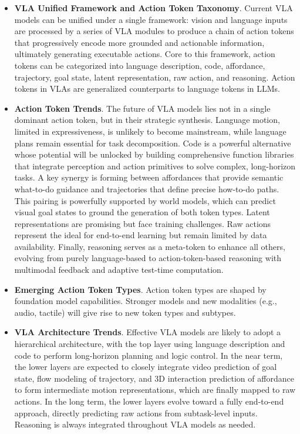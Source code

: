 \documentclass[10pt, a4paper, logo, copyright]{googledeepmind} %
\begin{document}
\begin{itemize}
    \item \textbf{VLA Unified Framework and Action Token Taxonomy}. Current VLA models can be unified under a single framework: vision and language inputs are processed by a series of VLA modules to produce a chain of action tokens that progressively encode more grounded and actionable information, ultimately generating executable actions. Core to this framework, action tokens can be categorized into language description, code, affordance, trajectory, goal state, latent representation, raw action, and reasoning. Action tokens in VLAs are generalized counterparts to language tokens in LLMs.
    \vspace{5pt}
    \item \textbf{Action Token Trends}. The future of VLA models lies not in a single dominant action token, but in their strategic synthesis. Language motion, limited in expressiveness, is unlikely to become mainstream, while language plans remain essential for task decomposition. Code is a powerful alternative whose potential will be unlocked by building comprehensive function libraries that integrate perception and action primitives to solve complex, long-horizon tasks. A key synergy is forming between affordances that provide semantic what-to-do guidance and trajectories that define precise how-to-do paths. This pairing is powerfully supported by world models, which can predict visual goal states to ground the generation of both token types. Latent representations are promising but face training challenges. Raw actions represent the ideal for end-to-end learning but remain limited by data availability. Finally, reasoning serves as a meta-token to enhance all others, evolving from purely language-based to action-token-based reasoning with multimodal feedback and adaptive test-time computation.
    \vspace{5pt}
    \item \textbf{Emerging Action Token Types}. Action token types are shaped by foundation model capabilities. Stronger models and new modalities (e.g., audio, tactile) will give rise to new token types and subtypes.
    \vspace{5pt}
    \item \textbf{VLA Architecture Trends}. Effective VLA models are likely to adopt a hierarchical architecture, with the top layer using language description and code to perform long-horizon planning and logic control. In the near term, the lower layers are expected to closely integrate video prediction of goal state, flow modeling of trajectory, and 3D interaction prediction of affordance to form intermediate motion representations, which are finally mapped to raw actions. In the long term, the lower layers evolve toward a fully end-to-end approach, directly predicting raw actions from subtask-level inputs. Reasoning is always integrated throughout VLA models as needed.

\end{itemize}
\end{document}
